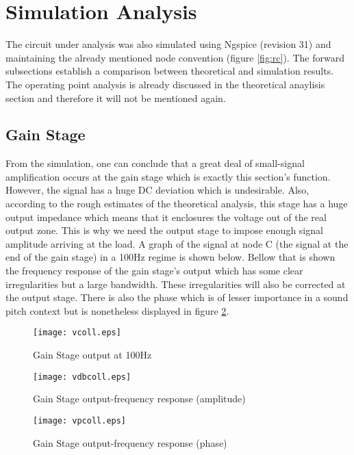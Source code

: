 \section{Simulation Analysis}
\label{sec:simulation}

The circuit under analysis was also simulated using Ngspice (revision 31) and maintaining the already mentioned node convention (figure \ref{fig:rc}). The forward subsections establish a comparison between theoretical and simulation results. The operating point analysis is already discussed in the theoretical anaylisis section and therefore it will not be mentioned again.

\subsection{Gain Stage}
From the simulation, one can conclude that a great deal of small-signal amplification occurs at the gain stage which is exactly this section's function. However, the signal has a huge DC deviation which is undesirable. Also, according to the rough estimates of the theoretical analysis, this stage has a huge output impedance which means that it enclosures the voltage out of the real output zone. This is why we need the output stage to impose enough signal amplitude arriving at the load. A graph of the signal at node C (the signal at the end of the gain stage) in a 100Hz regime is shown below. Bellow that is shown the frequency response of the gain stage's output which has some clear irregularities but a large bandwidth. These irregularities will also be corrected at the output stage. There is also the phase which is of lesser importance in a sound pitch context but is nonetheless displayed in figure \ref{fig:vpcoll}.

\begin{figure}[h] \centering
\texttt{[image: vcoll.eps]}%
\vspace{-5mm}
\caption{Gain Stage output at 100Hz}
\label{fig:vcoll}
\end{figure}
\vspace{-5mm}


\begin{figure}[h] \centering
  \begin{minipage}{.45\textwidth}
    \texttt{[image: vdbcoll.eps]}
    \caption{Gain Stage output-frequency response (amplitude)}
    \label{fig:vdbcoll}
  \end{minipage}%
    \hspace{2 mm}
  \begin{minipage}{.45\textwidth}
  \centering
    \texttt{[image: vpcoll.eps]}
    \caption{Gain Stage output-frequency response (phase)}
    \label{fig:vpcoll}
      \end{minipage}%
\end{figure}

